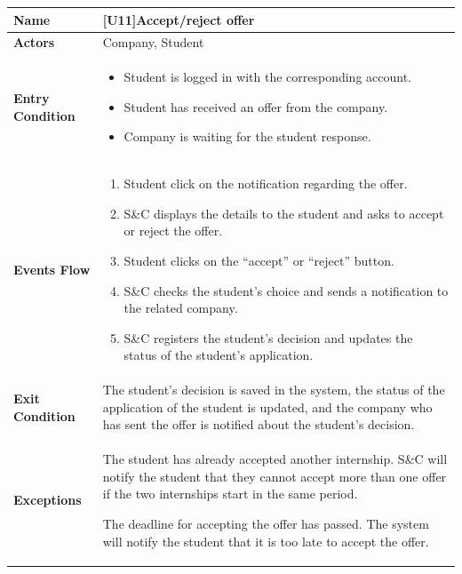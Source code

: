 \begin{center}
    \begin{tabular}{|p{9em}|p{27em}|}
        \hline
        \rowcolor{bluepoli!40} %
        \textbf{Name} & \textbf{[U11]Accept/reject offer} \\
        \hline
        \textbf{Actors} & Company, Student\\
        \hline
        \textbf{Entry Condition} & 
        \begin{itemize}
            \item Student is logged in with the corresponding account.
            \item Student has received an offer from the company.
            \item Company is waiting for the student response.
        \end{itemize} \\
        \hline
        \textbf{Events Flow} & 
        \begin{enumerate}
            \item Student click on the notification regarding the offer.
            \item S\&C displays the details to the student and asks to accept or reject the offer.
            \item Student clicks on the ``accept'' or ``reject'' button.
            \item S\&C checks the student's choice and sends a notification to the related company.
            \item S\&C registers the student's decision and updates the status of the student's application.
        \end{enumerate} \\
        \hline
        \textbf{Exit Condition} & 
         The student's decision is saved in the system, the status of the application of the student is updated, and the company
         who has sent the offer is notified about the student's decision.\\
        \hline
        \textbf{Exceptions} &
        The student has already accepted another internship. S\&C will notify the student that they cannot accept more than one offer if 
        the two internships start in the same period.

        The deadline for accepting the offer has passed. The system will notify the student that it is too late to accept the offer.\\
        \hline
    \end{tabular}
\end{center}

